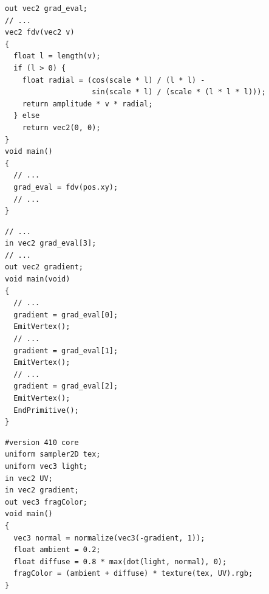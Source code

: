 \documentclass[calcdimensions,landscape,letterpaper]{powersem}
\newcommand{\thecurrentheading}{}
\newcommand{\heading}[1]{\renewcommand{\thecurrentheading}{#1}}
\begin{document}
\begin{slide}
    \heading{Diffuse Lighting: Tessellation Evaluation Shader}
    \begin{center}
        \begin{minipage}[c]{.95\textwidth}
            \begin{verbatim}
out vec2 grad_eval;
// ...
vec2 fdv(vec2 v)
{
  float l = length(v);
  if (l > 0) {
    float radial = (cos(scale * l) / (l * l) -
                    sin(scale * l) / (scale * (l * l * l)));
    return amplitude * v * radial;
  } else
    return vec2(0, 0);
}
void main()
{
  // ...
  grad_eval = fdv(pos.xy);
  // ...
}
            \end{verbatim}
        \end{minipage}
    \end{center}
\end{slide}

\begin{slide}
    \heading{Diffuse Lighting: Geometry Shader}
    \begin{center}
        \begin{minipage}[c]{.95\textwidth}
            \begin{verbatim}
// ...
in vec2 grad_eval[3];
// ...
out vec2 gradient;
void main(void)
{
  // ...
  gradient = grad_eval[0];
  EmitVertex();
  // ...
  gradient = grad_eval[1];
  EmitVertex();
  // ...
  gradient = grad_eval[2];
  EmitVertex();
  EndPrimitive();
}
            \end{verbatim}
        \end{minipage}
    \end{center}
\end{slide}

\begin{slide}
    \heading{Diffuse Lighting: Fragment Shader}
    \begin{center}
        \begin{minipage}[c]{.85\textwidth}
            \begin{verbatim}
#version 410 core
uniform sampler2D tex;
uniform vec3 light;
in vec2 UV;
in vec2 gradient;
out vec3 fragColor;
void main()
{
  vec3 normal = normalize(vec3(-gradient, 1));
  float ambient = 0.2;
  float diffuse = 0.8 * max(dot(light, normal), 0);
  fragColor = (ambient + diffuse) * texture(tex, UV).rgb;
}
            \end{verbatim}
        \end{minipage}
    \end{center}
\end{slide}
\end{document}
